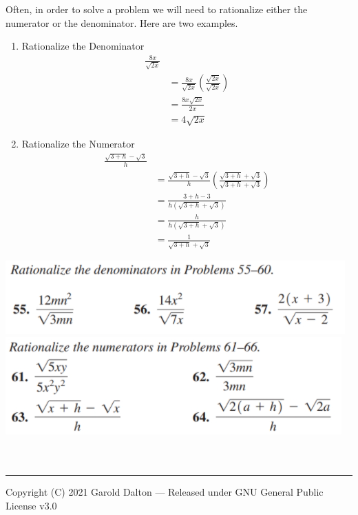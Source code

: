 \documentclass[14pt]{extarticle}
\begin{document}
Often, in order to solve a problem we will need to rationalize either the numerator or the denominator. Here are two examples.
\begin{enumerate}
	\item Rationalize the Denominator
	\begin{align*}
		\frac{8x}{\sqrt{2x}} & \\
		&= \frac{8x}{\sqrt{2x}}\left(\frac{\sqrt{2x}}{\sqrt{2x}}\right) \\
		&= \frac{8x\sqrt{2x}}{2x} \\
		&= 4\sqrt{2x}
	\end{align*}
	\item Rationalize the Numerator
	\begin{align*}
		\frac{\sqrt{3+h}- \sqrt{3}}{h} & \\
		&= \frac{\sqrt{3+h}- \sqrt{3}}{h}\left(\frac{\sqrt{3+h}+ \sqrt{3}}{\sqrt{3+h}+ \sqrt{3}}\right) \\
		&= \frac{3+h- 3}{h(\sqrt{3+h}+ \sqrt{3})} \\
		&= \frac{h}{h(\sqrt{3+h}+ \sqrt{3})} \\
		&= \frac{1}{\sqrt{3+h}+ \sqrt{3}}
	\end{align*}
\end{enumerate}
\begin{center}
	\includegraphics[width=.8\linewidth]{a-6-4}
	\includegraphics[width=.8\linewidth]{a-6-5}
\end{center}


\begin{align*}
\end{align*}

\begin{align*}
\end{align*}






\noindent\rule{\textwidth}{1pt}
{\footnotesize Copyright (C) 2021 Garold Dalton --- Released under GNU General Public License v3.0}


\cleardoublepage
\end{document}
